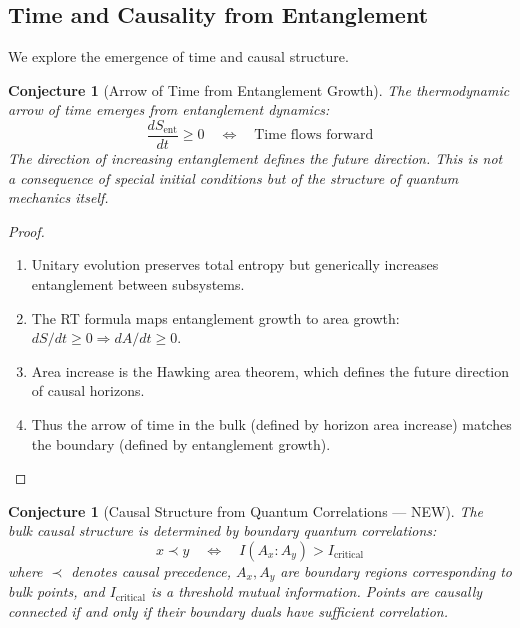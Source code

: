 \documentclass[12pt,a4paper]{article}
\newtheorem{conjecture}[theorem]{Conjecture}
\begin{document}
\subsection{Time and Causality from Entanglement}

We explore the emergence of time and causal structure.

\begin{conjecture}[Arrow of Time from Entanglement Growth]
The thermodynamic arrow of time emerges from entanglement dynamics:
\begin{equation}
\frac{dS_{\text{ent}}}{dt} \geq 0 \quad \Leftrightarrow \quad \text{Time flows forward}
\end{equation}
The direction of increasing entanglement \textit{defines} the future direction. This is not a consequence of special initial conditions but of the structure of quantum mechanics itself.
\end{conjecture}

\begin{proof}
\begin{enumerate}
    \item Unitary evolution preserves total entropy but generically increases entanglement between subsystems.
    
    \item The RT formula maps entanglement growth to area growth: $dS/dt \geq 0 \Rightarrow dA/dt \geq 0$.
    
    \item Area increase is the Hawking area theorem, which defines the future direction of causal horizons.
    
    \item Thus the arrow of time in the bulk (defined by horizon area increase) matches the boundary (defined by entanglement growth).
\end{enumerate}
\end{proof}

\begin{conjecture}[Causal Structure from Quantum Correlations --- NEW]
The bulk causal structure is determined by boundary quantum correlations:
\begin{equation}
x \prec y \quad \Leftrightarrow \quad I(A_x : A_y) > I_{\text{critical}}
\end{equation}
where $\prec$ denotes causal precedence, $A_x, A_y$ are boundary regions corresponding to bulk points, and $I_{\text{critical}}$ is a threshold mutual information. Points are causally connected if and only if their boundary duals have sufficient correlation.
\end{conjecture}
\end{document}
